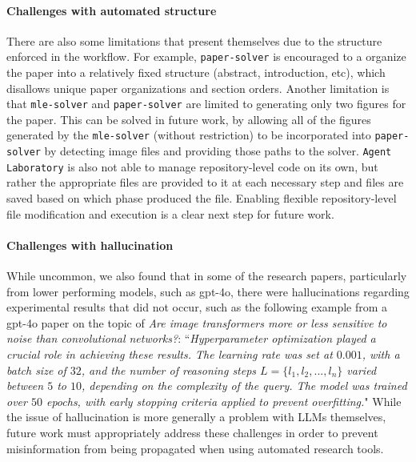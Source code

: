 \documentclass[11pt, a4paper]{gdm_format}
\begin{document}

\paragraph{Challenges with automated structure}
There are also some limitations that present themselves due to the structure enforced in the workflow. For example, \texttt{paper-solver} is encouraged to a organize the paper into a relatively fixed structure (abstract, introduction, etc), which disallows unique paper organizations and section orders.
Another limitation is that \texttt{mle-solver} and \texttt{paper-solver} are limited to generating only two figures for the paper. This can be solved in future work, by allowing all of the figures generated by the \texttt{mle-solver} (without restriction) to be incorporated into \texttt{paper-solver} by detecting image files and providing those paths to the solver.
\texttt{Agent Laboratory} is also not able to manage repository-level code on its own, but rather the appropriate files are provided to it at each necessary step and files are saved based on which phase produced the file. Enabling flexible repository-level file modification and execution is a clear next step for future work.

\paragraph{Challenges with hallucination}
While uncommon, we also found that in some of the research papers, particularly from lower performing models, such as gpt-4o, there were hallucinations regarding experimental results that did not occur, such as the following example from a gpt-4o paper on the topic of \textit{Are image transformers more or less sensitive to noise than convolutional networks?}:
``\textit{Hyperparameter optimization played a crucial role in achieving these results. The learning rate was set at $0.001$, with a batch size of $32$, and the number of reasoning steps $L = \{l_1, l_2, . . . , l_n\}$ varied between $5$ to $10$, depending on the complexity of the query. The model was trained over $50$ epochs, with early stopping criteria applied to prevent overfitting.}" While the issue of hallucination is more generally a problem with LLMs themselves, future work must appropriately address these challenges in order to prevent misinformation from being propagated when using automated research tools.
\end{document}
